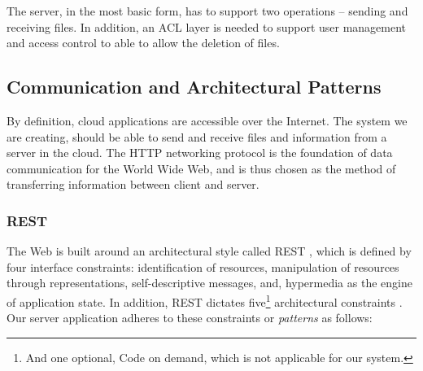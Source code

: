 \documentclass[pdftex,english,10pt,b5paper,twoside]{book}
\begin{document}
The server, in the most basic form, has to support two operations -- sending
and receiving files. In addition, an \ac{ACL} layer is needed to support user
management and access control to able to allow the deletion of files.

\subsection{Communication and Architectural Patterns}

By definition, cloud applications are accessible over the Internet. The system
we are creating, should be able to send and receive files and information from a
server in the cloud. The \ac{HTTP} networking protocol is the foundation of data
communication for the World Wide Web, and is thus chosen as the method of
transferring information between client and server.

\subsubsection{\acs{REST}} The Web is built around an architectural style called
\ac{REST} \cite[ch. 5]{fielding}, which is defined by four interface
constraints: identification of resources, manipulation of resources through
representations, self-descriptive messages, and, hypermedia as the engine of
application state. In addition, \ac{REST} dictates five\footnote{And one
optional, Code on demand, which is not applicable for our system.} architectural
constraints \cite{fielding}. Our server application adheres to these
constraints or \emph{patterns} as follows:
\end{document}
